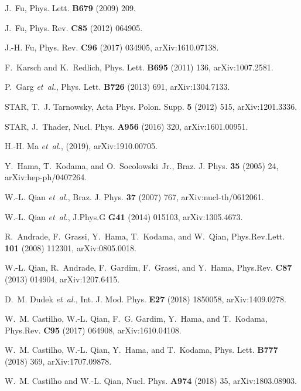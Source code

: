 \documentclass[secnumarabic, graphics,floatfix, nofootinbib,tightenlines,nobibnotes, aps, prl, 12pt]{revtex4-1}
\begin{document}
\begin{thebibliography}{10}
J.~Fu,
\newblock Phys. Lett. {\bf B679} (2009) 209.

J.~Fu,
\newblock Phys. Rev. {\bf C85} (2012) 064905.

J.-H. Fu,
\newblock Phys. Rev. {\bf C96} (2017) 034905, arXiv:1610.07138.

F.~Karsch and K.~Redlich,
\newblock Phys. Lett. {\bf B695} (2011) 136, arXiv:1007.2581.

P.~Garg {\em et~al.},
\newblock Phys. Lett. {\bf B726} (2013) 691, arXiv:1304.7133.

STAR, T.~J. Tarnowsky,
\newblock Acta Phys. Polon. Supp. {\bf 5} (2012) 515, arXiv:1201.3336.

STAR, J.~Thader,
\newblock Nucl. Phys. {\bf A956} (2016) 320, arXiv:1601.00951.

H.-H. Ma {\em et~al.},
\newblock (2019), arXiv:1910.00705.

Y.~Hama, T.~Kodama, and O.~Socolowski~Jr.,
\newblock Braz. J. Phys. {\bf 35} (2005) 24, arXiv:hep-ph/0407264.

W.-L. Qian {\em et~al.},
\newblock Braz. J. Phys. {\bf 37} (2007) 767, arXiv:nucl-th/0612061.

W.-L. Qian {\em et~al.},
\newblock J.Phys.G {\bf G41} (2014) 015103, arXiv:1305.4673.

R.~Andrade, F.~Grassi, Y.~Hama, T.~Kodama, and W.~Qian,
\newblock Phys.Rev.Lett. {\bf 101} (2008) 112301, arXiv:0805.0018.

W.-L. Qian, R.~Andrade, F.~Gardim, F.~Grassi, and Y.~Hama,
\newblock Phys.Rev. {\bf C87} (2013) 014904, arXiv:1207.6415.

D.~M. Dudek {\em et~al.},
\newblock Int. J. Mod. Phys. {\bf E27} (2018) 1850058, arXiv:1409.0278.

W.~M. Castilho, W.-L. Qian, F.~G. Gardim, Y.~Hama, and T.~Kodama,
\newblock Phys.Rev. {\bf C95} (2017) 064908, arXiv:1610.04108.

W.~M. Castilho, W.-L. Qian, Y.~Hama, and T.~Kodama,
\newblock Phys. Lett. {\bf B777} (2018) 369, arXiv:1707.09878.

W.~M. Castilho and W.-L. Qian,
\newblock Nucl. Phys. {\bf A974} (2018) 35, arXiv:1803.08903.


\end{thebibliography}
\end{document}
